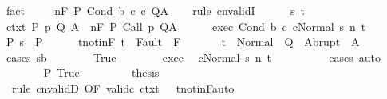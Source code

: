 \begin{isabellebody}
\ fact\isanewline
\ \ \isamarkupfalse%
\ {\isachardoublequoteopen}{\isasymGamma}{\isacharcomma}{\isasymTheta}\ {\isasymTurnstile}n{\isacharcolon}\isactrlbsub {\isacharslash}F\isactrlesub \ P\ Cond\ b\ c{}\ c{}\ Q{\isacharcomma}A{\isachardoublequoteclose}\isanewline
\ \ \isamarkupfalse%
\ {\isacharparenleft}rule\ cnvalidI{\isacharparenright}\isanewline
\ \ \ \ \isamarkupfalse%
\ s\ t\isanewline
\ \ \ \ \isamarkupfalse%
\ ctxt{\isacharcolon}\ {\isachardoublequoteopen}{\isasymforall}{\isacharparenleft}P{\isacharcomma}\ p{\isacharcomma}\ Q{\isacharcomma}\ A{\isacharparenright}{\isasymin}{\isasymTheta}{\isachardot}\ {\isasymGamma}\ {\isasymTurnstile}n{\isacharcolon}\isactrlbsub {\isacharslash}F\isactrlesub \ P\ {\isacharparenleft}Call\ p{\isacharparenright}\ Q{\isacharcomma}A{\isachardoublequoteclose}\isanewline
\ \ \ \ \isamarkupfalse%
\ exec{\isacharcolon}\ {\isachardoublequoteopen}{\isasymGamma}{\isasymturnstile}{\isasymlangle}Cond\ b\ c{}\ c{}{\isacharcomma}Normal\ s{\isasymrangle}\ {\isacharequal}n{\isasymRightarrow}\ t{\isachardoublequoteclose}\isanewline
\ \ \ \ \isamarkupfalse%
\ P{\isacharcolon}\ {\isachardoublequoteopen}s\ {\isasymin}\ P{\isachardoublequoteclose}\isanewline
\ \ \ \ \isamarkupfalse%
\ t{\isacharunderscore}notin{\isacharunderscore}F{\isacharcolon}\ {\isachardoublequoteopen}t\ {\isasymnotin}\ Fault\ {\isacharbackquote}\ F{\isachardoublequoteclose}\ \isanewline
\ \ \ \ \isamarkupfalse%
\ {\isachardoublequoteopen}t\ {\isasymin}\ Normal\ {\isacharbackquote}\ Q\ {\isasymunion}\ Abrupt\ {\isacharbackquote}\ A{\isachardoublequoteclose}\isanewline
\ \ \ \ \isamarkupfalse%
\ {\isacharparenleft}cases\ {\isachardoublequoteopen}s{\isasymin}b{\isachardoublequoteclose}{\isacharparenright}\isanewline
\ \ \ \ \ \ \isamarkupfalse%
\ True\isanewline
\ \ \ \ \ \ \isamarkupfalse%
\ exec\ \isamarkupfalse%
\ {\isachardoublequoteopen}{\isasymGamma}{\isasymturnstile}{\isasymlangle}c{}{\isacharcomma}Normal\ s{\isasymrangle}\ {\isacharequal}n{\isasymRightarrow}\ t{\isachardoublequoteclose}\isanewline
\ \ \ \ \ \ \ \ \isamarkupfalse%
\ cases\ auto\isanewline
\ \ \ \ \ \ \isamarkupfalse%
\ P\ True\ \isanewline
\ \ \ \ \ \ \isamarkupfalse%
\ {\isacharquery}thesis\isanewline
\ \ \ \ \ \ \ \ \isamarkupfalse%
\ {\isacharminus}\ {\isacharparenleft}rule\ cnvalidD\ {\isacharbrackleft}OF\ valid{\isacharunderscore}c{}\ ctxt\ {\isacharunderscore}\ {\isacharunderscore}\ t{\isacharunderscore}notin{\isacharunderscore}F{\isacharbrackright}{\isacharcomma}auto{\isacharparenright}\isanewline

\end{isabellebody}
